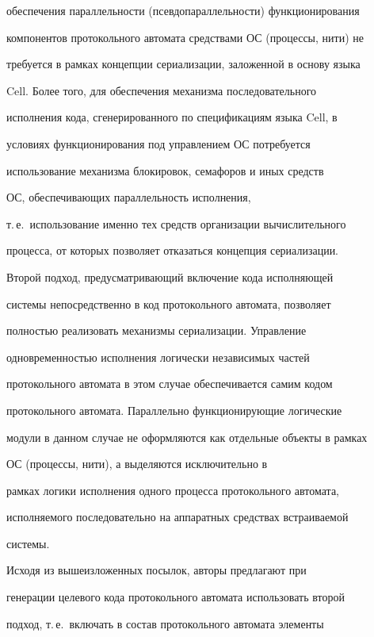 обеспечения параллельности (псевдопараллельности) функционирования 


компонентов протокольного автомата средствами ОС (процессы, нити) не 


требуется в рамках концепции сериализации, заложенной в основу языка 


Cell. Более того, для обеспечения механизма последовательного 


исполнения кода, сгенерированного по спецификациям языка Cell, в 


условиях функционирования под управлением ОС потребуется 


использование механизма блокировок, семафоров и иных средств 


ОС, обеспечивающих параллельность исполнения,


т.\,е.\ использование именно тех средств организации вычислительного 


процесса, от которых позволяет отказаться концепция сериализации.


      


      Второй подход, предусматривающий включение кода исполняющей 


сис\-те\-мы непосредственно в код протокольного автомата, позволяет 


полностью реализовать механизмы сериализации. Управление 


одновременностью исполнения логически независимых частей 


протокольного автомата в этом случае обеспечивается самим кодом 


протокольного автомата. Параллельно функционирующие логические 


модули в данном случае не оформляются как  отдельные объекты в рамках 


ОС (процессы, нити), а выделяются исключительно в 


рамках логики исполнения одного процесса протокольного автомата, 


исполняемого последовательно на аппаратных средствах встраиваемой 


сис\-те\-мы.


      


      Исходя из вышеизложенных посылок, авторы предлагают при 


генерации целевого кода протокольного автомата использовать второй 


подход, т.\,е.\ включать в состав протокольного автомата элементы 



